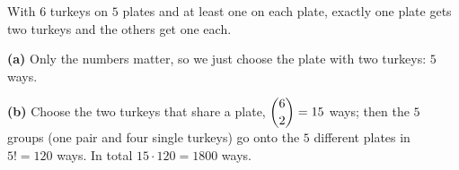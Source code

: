 With $6$ turkeys on $5$ plates and at least one on each plate, exactly one plate gets two turkeys and the others get one each.

\textbf{(a)} Only the numbers matter, so we just choose the plate with two turkeys: $\boxed{5}$ ways.

\textbf{(b)} Choose the two turkeys that share a plate, $\dbinom62=15$ ways; then the $5$ groups (one pair and four single turkeys) go onto the $5$ different plates in $5!=120$ ways. In total $15\cdot120=\boxed{1800}$ ways.
